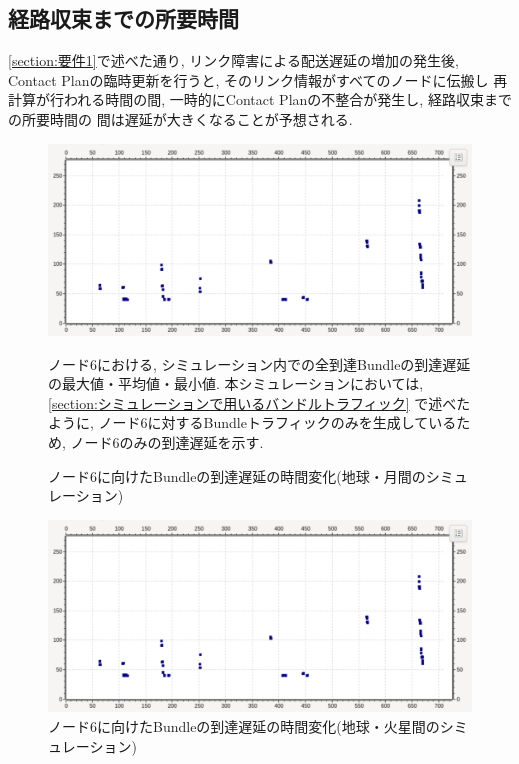 \subsection{経路収束までの所要時間}
\label{section:経路収束までの所要時間}
\ref{section:要件1}で述べた通り, リンク障害による配送遅延の増加の発生後, 
Contact Planの臨時更新を行うと, そのリンク情報がすべてのノードに伝搬し
再計算が行われる時間の間, 一時的にContact Planの不整合が発生し, 経路収束までの所要時間の
間は遅延が大きくなることが予想される. 
\begin{figure}[tbh]
    \centering
    \includegraphics[width=0.7\textheight]{img/thesis_sample_delay_time.pdf}
    \caption{ノード6に向けたBundleの到達遅延の時間変化(地球・月間のシミュレーション)}
    \label{fig:delay_time_variation_earth_moon}
    \begin{minipage}{\textwidth}
        \raggedright
        \vspace{3mm}
        ノード6における, シミュレーション内での全到達Bundleの到達遅延の最大値・平均値・最小値. 
        本シミュレーションにおいては, \ref{section:シミュレーションで用いるバンドルトラフィック}
        で述べたように, ノード6に対するBundleトラフィックのみを生成しているため, 
        ノード6のみの到達遅延を示す. 
    \end{minipage}
\end{figure}

\begin{figure}[tbh]
    \centering
    \includegraphics[width=0.7\textheight]{img/thesis_sample_delay_time.pdf}
    \caption{ノード6に向けたBundleの到達遅延の時間変化(地球・火星間のシミュレーション)}
    \label{fig:delay_time_variation_earth_mars}
    \begin{minipage}{\textwidth}
        \raggedright
    \end{minipage}
\end{figure}


